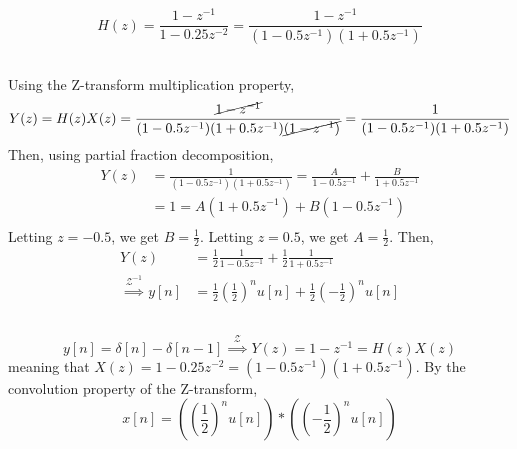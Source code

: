 \documentclass{article}
\begin{document}
\newpage
\section{}

\begin{equation}
    H(z) = \frac{1 - z^{-1}}{1 - 0.25z^{-2}} = \frac{1 - z^{-1}}{(1 - 0.5z^{-1}) (1 + 0.5z^{-1})}
\end{equation}

\subsection{}

Using the Z-transform multiplication property,
\begin{equation}
    Y(z) = H(z) X(z) = \frac{\cancel{1 - z^{-1}}}{(1 - 0.5z^{-1}) (1 + 0.5z^{-1}) \cancel{(1 - z^{-1})}} = \frac{1}{(1 - 0.5z^{-1}) (1 + 0.5z^{-1})}
\end{equation}
Then, using partial fraction decomposition,
\begin{align}
    Y(z) &= \frac{1}{(1 - 0.5z^{-1}) (1 + 0.5z^{-1})} = \frac{A}{1 - 0.5z^{-1}} + \frac{B}{1 + 0.5z^{-1}} \\
    &= 1 = A(1 + 0.5z^{-1}) + B(1 - 0.5z^{-1}) \\
\end{align}
Letting \(z = -0.5\), we get \(B = \frac{1}{2}\).
Letting \(z = 0.5\), we get \(A = \frac{1}{2}\).
Then,
\begin{align}
    Y(z) &= \frac{1}{2} \frac{1}{1 - 0.5z^{-1}} + \frac{1}{2} \frac{1}{1 + 0.5z^{-1}} \\
    \overset{\mathcal{Z}^{-1}}{\implies} y[n] &= \frac{1}{2} \left(\frac{1}{2}\right)^n u[n] + \frac{1}{2} \left(-\frac{1}{2}\right)^n u[n]
\end{align}

\subsection{}

\begin{equation}
    y[n] = \delta[n] - \delta[n - 1] \overset{\mathcal{Z}}{\implies} Y(z) = 1 - z^{-1} = H(z) X(z)
\end{equation}
meaning that \(X(z) = 1 - 0.25z^{-2} = (1 - 0.5z^{-1}) (1 + 0.5z^{-1})\).
By the convolution property of the Z-transform,
\begin{equation}
    x[n] = \left(\left(\frac{1}{2}\right)^n u[n]\right) \ast \left(\left(-\frac{1}{2}\right)^n u[n]\right)
\end{equation}
\end{document}
